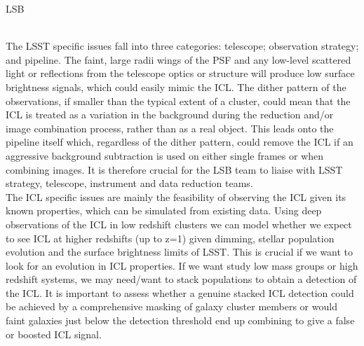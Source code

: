\begin{tasklist}{LSB}
\begin{task}
{\\
The LSST specific issues fall into three categories: telescope; observation strategy; and pipeline. The faint, large radii wings of the PSF and any low-level scattered light or reflections from the telescope optics or structure will produce low surface brightness signals, which could easily mimic the ICL. The dither pattern of the observations, if smaller than the typical extent of a cluster, could mean that the ICL is treated as a variation in the background during the reduction and/or image combination process, rather than as a real object. This leads onto the pipeline itself which, regardless of the dither pattern, could remove the ICL if an aggressive background subtraction is used on either single frames or when combining images. It is therefore crucial for the LSB team to liaise with LSST strategy, telescope, instrument and data reduction teams.
\\
The ICL specific issues are mainly the feasibility of observing the ICL given its known properties, which can be simulated from existing data. Using deep observations of the ICL in low redshift clusters we can model whether we expect to see ICL at higher redshifts (up to z=1) given dimming, stellar population evolution and the surface brightness limits of LSST. This is crucial if we want to look for an evolution in ICL properties. If we want study low mass groups or high redshift systems, we may need/want to stack populations to obtain a detection of the ICL. It is important to assess whether a genuine stacked ICL detection could be achieved by a comprehensive masking of galaxy cluster members or would faint galaxies just below the detection threshold end up combining to give a false or boosted ICL signal.
}
\end{task}
\end{tasklist}